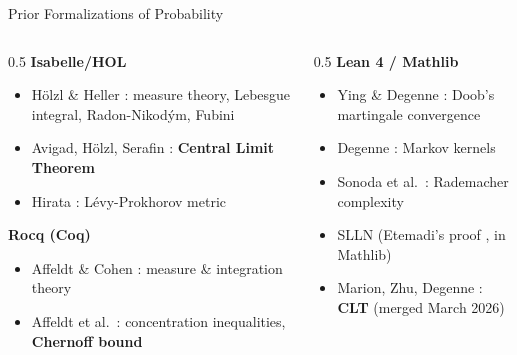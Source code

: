 \documentclass[aspectratio=169]{beamer}
\begin{document}
\begin{frame}{Prior Formalizations of Probability}
  \begin{columns}[T]
    \begin{column}{0.5\textwidth}
      \textbf{Isabelle/HOL}
      \begin{itemize}
        \item H\"olzl \& Heller \cite{holzl2011}: measure theory, Lebesgue integral, Radon-Nikod\'ym, Fubini
        \item Avigad, H\"olzl, Serafin \cite{avigad2017clt}: \textbf{Central Limit Theorem}
        \item Hirata \cite{hirata2024levy}: L\'evy-Prokhorov metric
      \end{itemize}
      \vspace{0.3cm}
      \textbf{Rocq (Coq)}
      \begin{itemize}
        \item Affeldt \& Cohen \cite{affeldt2023}: measure \& integration theory
        \item Affeldt et al.\ \cite{affeldt2025concentration}: concentration inequalities, \textbf{Chernoff bound}
      \end{itemize}
    \end{column}
    \begin{column}{0.5\textwidth}
      \textbf{Lean 4 / Mathlib} \cite{mathlib2020}
      \begin{itemize}
        \item Ying \& Degenne \cite{ying2023martingale}: Doob's martingale convergence
        \item Degenne \cite{degenne2025kernels}: Markov kernels
        \item Sonoda et al.\ \cite{sonoda2025rademacher}: Rademacher complexity
        \item SLLN (Etemadi's proof \cite{etemadi1981slln}, in Mathlib)
        \item Marion, Zhu, Degenne \cite{marion2026clt}: \textbf{CLT} (merged March 2026)
      \end{itemize}
    \end{column}
  \end{columns}
\end{frame}
\end{document}
